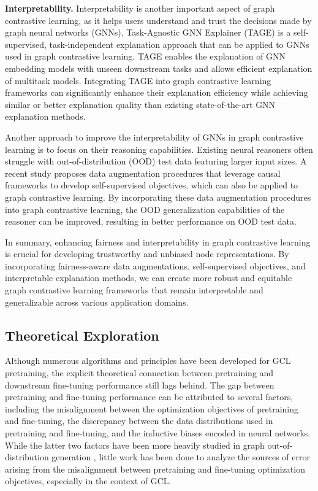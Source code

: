 \documentclass[11pt]{article}
\begin{document}
\textbf{Interpretability.} Interpretability is another important aspect of graph contrastive learning, as it helps users understand and trust the decisions made by graph neural networks (GNNs). Task-Agnostic GNN Explainer (TAGE) \cite{xie2022task} is a self-supervised, task-independent explanation approach that can be applied to GNNs used in graph contrastive learning. TAGE enables the explanation of GNN embedding models with unseen downstream tasks and allows efficient explanation of multitask models. Integrating TAGE into graph contrastive learning frameworks can significantly enhance their explanation efficiency while achieving similar or better explanation quality than existing state-of-the-art GNN explanation methods.

Another approach to improve the interpretability of GNNs in graph contrastive learning is to focus on their reasoning capabilities. Existing neural reasoners often struggle with out-of-distribution (OOD) test data featuring larger input sizes. A recent study \cite{bevilacqua2023neural} proposes data augmentation procedures that leverage causal frameworks to develop self-supervised objectives, which can also be applied to graph contrastive learning. By incorporating these data augmentation procedures into graph contrastive learning, the OOD generalization capabilities of the reasoner can be improved, resulting in better performance on OOD test data.

In summary, enhancing fairness and interpretability in graph contrastive learning is crucial for developing trustworthy and unbiased node representations. By incorporating fairness-aware data augmentations, self-supervised objectives, and interpretable explanation methods, we can create more robust and equitable graph contrastive learning frameworks that remain interpretable and generalizable across various application domains.

\subsection{Theoretical Exploration}
Although numerous algorithms and principles have been developed for GCL pretraining, the explicit theoretical connection between pretraining and downstream fine-tuning performance still lags behind. The gap between pretraining and fine-tuning performance can be attributed to several factors, including the misalignment between the optimization objectives of pretraining and fine-tuning, the discrepancy between the data distributions used in pretraining and fine-tuning, and the inductive biases encoded in neural networks. While the latter two factors have been more heavily studied in graph out-of-distribution generation \cite{bevilacqua2021size, you2023graph}, little work has been done to analyze the sources of error arising from the misalignment between pretraining and fine-tuning optimization objectives, especially in the context of GCL.
\end{document}

